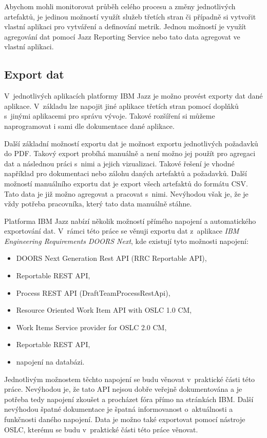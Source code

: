 \documentclass[czech,master]{diploma}
\begin{document}
Abychom mohli monitorovat průběh celého procesu a změny jednotlivých artefaktů, je jedinou možností využít služeb třetích stran či případně si vytvořit vlastní aplikaci pro vytváření a definování metrik. Jednou možností je využít agregování dat pomocí Jazz Reporting Service nebo tato data agregovat ve vlastní aplikaci.

\subsection{Export dat}
V~jednotlivých aplikacích platformy IBM Jazz je možno provést exporty dat dané aplikace. V~základu lze napojit jiné aplikace třetích stran pomocí doplňků s~jinými aplikacemi pro správu vývoje. Takové rozšíření si můžeme naprogramovat i sami dle dokumentace dané aplikace.

Další základní možností exportu dat je možnost exportu jednotlivých požadavků do PDF. Takový export probíhá manuálně a není možno jej použít pro agregaci dat a následnou práci s~nimi a jejich vizualizaci. Takové řešení je vhodné například pro dokumentaci nebo zálohu daných artefaktů a požadavků. Další možností manuálního exportu dat je export všech artefaktů do formátu CSV. Tato data je již možno agregovat a pracovat s~nimi. Nevýhodou však je, že je vždy potřeba pracovníka, který tato data manuálně stáhne.

Platforma IBM Jazz nabízí několik možností přímého napojení a automatického exportování dat. V~rámci této práce se věnuji exportu dat z~aplikace \textit{IBM Engineering Requirements DOORS Next}, kde existují tyto možnosti napojení:

\begin{itemize}
\item DOORS Next Generation Rest API (RRC Reportable API),
\item Reportable REST API,
\item Process REST API (DraftTeamProcessRestApi),
\item Resource Oriented Work Item API with OSLC 1.0 CM,
\item Work Items Service provider for OSLC 2.0 CM,
\item Reportable REST API,
\item napojení na databázi.
\end{itemize}

Jednotlivým možnostem těchto napojení se budu věnovat v~praktické části této práce. Nevýhodou je, že tato API nejsou dobře veřejně dokumentována a je potřeba tedy napojení zkoušet a procházet fóra přímo na stránkách IBM. Další nevýhodou špatné dokumentace je špatná informovanost o~aktuálnosti a funkčnosti daného napojení. Data je možno také exportovat pomocí nástroje OSLC, kterému se budu v~praktické části této práce věnovat.
\end{document}
